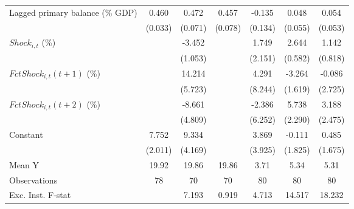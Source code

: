 {\begin{tabular}{l*{6}{c}}
\addlinespace
Lagged primary balance (\% GDP)&       0.460\sym{***}&       0.472\sym{***}&       0.457\sym{***}&      -0.135         &       0.048         &       0.054         \\
                    &     (0.033)         &     (0.071)         &     (0.078)         &     (0.134)         &     (0.055)         &     (0.053)         \\
\addlinespace
$ Shock_{i,t}$ (\%) &                     &      -3.452\sym{***}&                     &       1.749         &       2.644\sym{***}&       1.142         \\
                    &                     &     (1.053)         &                     &     (2.151)         &     (0.582)         &     (0.818)         \\
\addlinespace
$ FctShock_{i,t}(t+1)$ (\%)&                     &      14.214\sym{**} &                     &       4.291         &      -3.264\sym{*}  &      -0.086         \\
                    &                     &     (5.723)         &                     &     (8.244)         &     (1.619)         &     (2.725)         \\
\addlinespace
$ FctShock_{i,t}(t+2)$ (\%)&                     &      -8.661         &                     &      -2.386         &       5.738\sym{**} &       3.188         \\
                    &                     &     (4.809)         &                     &     (6.252)         &     (2.290)         &     (2.475)         \\
\addlinespace
Constant            &       7.752\sym{***}&       9.334\sym{**} &                     &       3.869         &      -0.111         &       0.485         \\
                    &     (2.011)         &     (4.169)         &                     &     (3.925)         &     (1.825)         &     (1.675)         \\
\midrule
Mean Y              &       19.92         &       19.86         &       19.86         &        3.71         &        5.34         &        5.31         \\
Observations        &          78         &          70         &          70         &          80         &          80         &          80         \\
Exc. Inst. F-stat   &                     &       7.193         &       0.919         &       4.713         &      14.517         &      18.232         \\
\bottomrule
\end{tabular}
}

